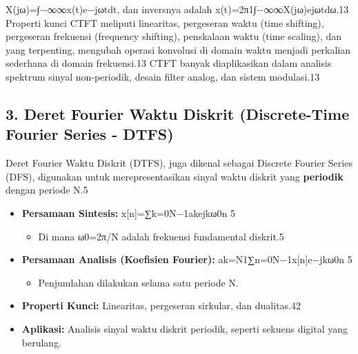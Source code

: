 \documentclass[
  letterpaper,
  DIV=11,
  numbers=noendperiod]{scrreprt}
\providecommand{\tightlist}{%
  \setlength{\itemsep}{0pt}\setlength{\parskip}{0pt}}\usepackage{longtable,booktabs,array}
\begin{document}
X(jω)=∫−∞∞\hspace{0pt}x(t)e−jωtdt, dan inversnya adalah
x(t)=2π1\hspace{0pt}∫−∞∞\hspace{0pt}X(jω)ejωtdω.13 Properti kunci CTFT
meliputi linearitas, pergeseran waktu (time shifting), pergeseran
frekuensi (frequency shifting), penskalaan waktu (time scaling), dan
yang terpenting, mengubah operasi konvolusi di domain waktu menjadi
perkalian sederhana di domain frekuensi.13 CTFT banyak diaplikasikan
dalam analisis spektrum sinyal non-periodik, desain filter analog, dan
sistem modulasi.13

\subsection{3. Deret Fourier Waktu Diskrit (Discrete-Time Fourier Series
-
DTFS)}\label{deret-fourier-waktu-diskrit-discrete-time-fourier-series---dtfs}

Deret Fourier Waktu Diskrit (DTFS), juga dikenal sebagai Discrete
Fourier Series (DFS), digunakan untuk merepresentasikan sinyal waktu
diskrit yang \textbf{periodik} dengan periode N.5

\begin{itemize}
\item
  \textbf{Persamaan Sintesis:}
  x{[}n{]}=∑k=0N−1\hspace{0pt}ak\hspace{0pt}ejkω0\hspace{0pt}n 5

  \begin{itemize}
  \tightlist
  \item
    Di mana ω0\hspace{0pt}=2π/N adalah frekuensi fundamental diskrit.5
  \end{itemize}
\item
  \textbf{Persamaan Analisis (Koefisien Fourier):}
  ak\hspace{0pt}=N1\hspace{0pt}∑n=0N−1\hspace{0pt}x{[}n{]}e−jkω0\hspace{0pt}n
  5

  \begin{itemize}
  \tightlist
  \item
    Penjumlahan dilakukan selama satu periode N.
  \end{itemize}
\item
  \textbf{Properti Kunci:} Linearitas, pergeseran sirkular, dan
  dualitas.42
\item
  \textbf{Aplikasi:} Analisis sinyal waktu diskrit periodik, seperti
  sekuens digital yang berulang.
\end{itemize}
\end{document}

